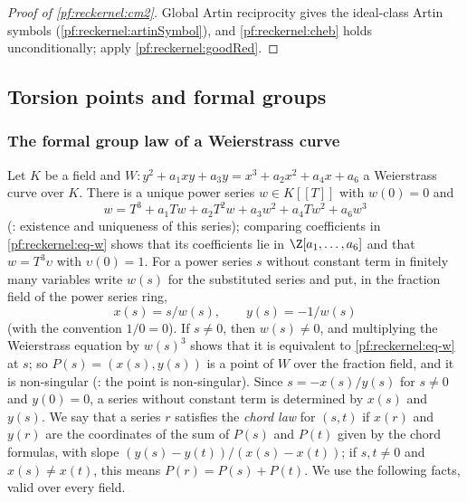 \begin{proof}[Proof of \cref{pf:reckernel:cm2}]
Global Artin reciprocity gives the ideal-class Artin symbols (\cref{pf:reckernel:artinSymbol}), and
\cref{pf:reckernel:cheb} holds unconditionally; apply \cref{pf:reckernel:goodRed}.
\end{proof}

\subsection{Torsion points and formal groups}\label{pf:reckernel:sec-cm4}

\subsubsection{The formal group law of a Weierstrass curve}\label{pf:reckernel:sec-fgl}
Let $K$ be a field and $W\colon y^2+a_1xy+a_3y=x^3+a_2x^2+a_4x+a_6$ a Weierstrass curve over $K$. There is a unique
power series $w\in K[[T]]$ with $w(0)=0$ and
\begin{equation}\label{pf:reckernel:eq-w}
w=T^3+a_1Tw+a_2T^2w+a_3w^2+a_4Tw^2+a_6w^3
\end{equation}
(: existence and uniqueness of this series); comparing coefficients in
\eqref{pf:reckernel:eq-w} shows that its coefficients lie in $\Z[a_1,\dots,a_6]$ and that $w=T^3\upsilon$ with
$\upsilon(0)=1$. For a power series $s$ without constant term in finitely many variables write $w(s)$ for the
substituted series and put, in the fraction field of the power series ring,
\[
x(s)=s/w(s),\qquad y(s)=-1/w(s)
\]
(with the convention $1/0=0$). If $s\ne0$, then $w(s)\ne0$, and multiplying the Weierstrass equation by $w(s)^3$ shows
that it is equivalent to \eqref{pf:reckernel:eq-w} at $s$; so $P(s)=(x(s),y(s))$ is a point of $W$ over the fraction
field, and it is non-singular (: the point is non-singular).
Since $s=-x(s)/y(s)$ for $s\ne0$ and $y(0)=0$, a series without constant term is determined by $x(s)$ and $y(s)$.
We say that a series $r$ satisfies the \emph{chord law} for $(s,t)$ if $x(r)$ and $y(r)$ are the coordinates of the sum
of $P(s)$ and $P(t)$ given by the chord formulas, with slope $(y(s)-y(t))/(x(s)-x(t))$; if $s,t\ne0$ and
$x(s)\ne x(t)$, this means $P(r)=P(s)+P(t)$. We use the following facts, valid over every field.

